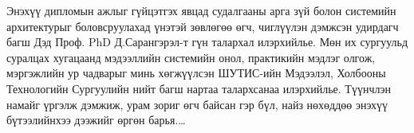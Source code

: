 
\begin{acknowledgements}
\addchaptertocentry{\acknowledgementname}

Энэхүү дипломын ажлыг гүйцэтгэх явцад судалгааны арга зүй болон системийн архитектурыг боловсруулахад үнэтэй зөвлөгөө өгч, чиглүүлэн дэмжсэн удирдагч багш Дэд Проф. PhD Д.Сарангэрэл-т гүн талархал илэрхийлье. Мөн их сургуульд суралцах хугацаанд мэдээллийн системийн онол, практикийн мэдлэг олгож, мэргэжлийн ур чадварыг минь хөгжүүлсэн ШУТИС-ийн Мэдээлэл, Холбооны Технологийн Сургуулийн нийт багш нартаа талархсанаа илэрхийлье. Түүнчлэн намайг үргэлж дэмжиж, урам зориг өгч байсан гэр бүл, найз нөхөддөө энэхүү бүтээлийнхээ дээжийг өргөн барья.\ldots

\end{acknowledgements}

